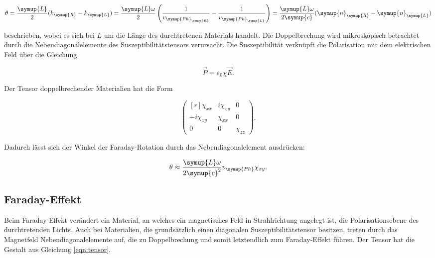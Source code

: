             \begin{equation}
                \theta = \frac{\symup{L}}2(k_{\symup{R}}-k_{\symup{L}}) = 
                \frac{\symup{L}\omega}2
                \left(\frac{1}{v_{\symup{Ph}_{\symup{R}}}}-\frac{1}{v_{\symup{Ph}_{\symup{L}}}}\right)
                = \frac{\symup{L}\omega}{2\symup{c}}(\symup{n}_{\symup{R}}-\symup{n}_{\symup{L}})
            \end{equation}

            beschrieben, wobei es sich bei $L$ um die Länge des durchtretenen Materials handelt.
            Die Doppelbrechung wird mikroskopisch betrachtet durch die 
            Nebendiagonalelemente des Suszeptibilitätstensors verursacht. 
            Die Suszeptibilität verknüpft die Polarisation mit dem elektrischen Feld über die 
            Gleichung 

            \begin{equation}
                \vec{P}=\varepsilon_0\chi\vec{E}.
            \end{equation}

            Der Tensor doppelbrechender Materialien hat die Form

            \begin{equation}
                \begin{pmatrix*}[r]
                    \chi_{xx} & i\chi_{xy} & 0 \\
                    -i\chi_{xy} & \chi_{xx} & 0 \\
                    0 & 0 & \chi_{zz}
                \end{pmatrix*}.
                \label{eqn:tensor}
            \end{equation}

            Dadurch lässt sich der Winkel der Faraday-Rotation durch das Nebendiagonalelement 
            ausdrücken:

            \begin{equation}
                \theta \approx \frac{\symup{L}\omega}{2\symup{c}^2}v_{\symup{Ph}}\chi_{xy}.
            \end{equation}


        \subsection{Faraday-Effekt}

            Beim Faraday-Effekt verändert ein Material, an welches ein magnetisches Feld 
            in Strahlrichtung angelegt ist, die Polarisationsebene des durchtretenden Lichts. 
            Auch bei Materialien, die grundsätzlich einen diagonalen Suszeptibilitätstensor besitzen,
            treten durch das Magnetfeld Nebendiagonalelemente auf, die zu Doppelbrechung und somit 
            letztendlich zum Faraday-Effekt führen. Der Tensor hat die Gestalt aus Gleichung \eqref{eqn:tensor}.

